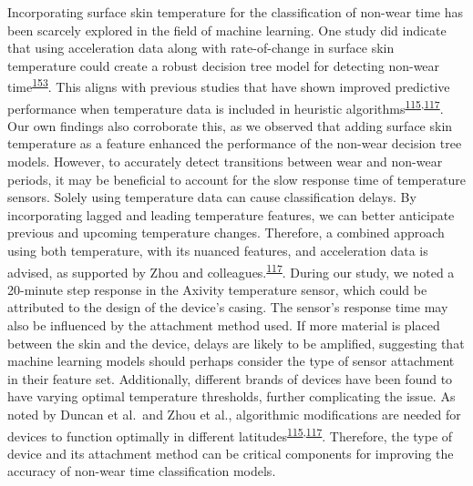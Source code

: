 \documentclass[
  10pt,
]{scrbook}
\begin{document}
Incorporating surface skin temperature for the classification of
non-wear time has been scarcely explored in the field of machine
learning. One study did indicate that using acceleration data along with
rate-of-change in surface skin temperature could create a robust
decision tree model for detecting non-wear
time\textsuperscript{\protect\hyperlink{ref-vert_detecting_2022}{153}}.
This aligns with previous studies that have shown improved predictive
performance when temperature data is included in heuristic
algorithms\textsuperscript{\protect\hyperlink{ref-duncan_wear-time_2018}{115},\protect\hyperlink{ref-zhou_classification_2015}{117}}.
Our own findings also corroborate this, as we observed that adding
surface skin temperature as a feature enhanced the performance of the
non-wear decision tree models. However, to accurately detect transitions
between wear and non-wear periods, it may be beneficial to account for
the slow response time of temperature sensors. Solely using temperature
data can cause classification delays. By incorporating lagged and
leading temperature features, we can better anticipate previous and
upcoming temperature changes. Therefore, a combined approach using both
temperature, with its nuanced features, and acceleration data is
advised, as supported by Zhou and
colleagues.\textsuperscript{\protect\hyperlink{ref-zhou_classification_2015}{117}}.
During our study, we noted a 20-minute step response in the Axivity
temperature sensor, which could be attributed to the design of the
device's casing. The sensor's response time may also be influenced by
the attachment method used. If more material is placed between the skin
and the device, delays are likely to be amplified, suggesting that
machine learning models should perhaps consider the type of sensor
attachment in their feature set. Additionally, different brands of
devices have been found to have varying optimal temperature thresholds,
further complicating the issue. As noted by Duncan et al.~and Zhou et
al., algorithmic modifications are needed for devices to function
optimally in different
latitudes\textsuperscript{\protect\hyperlink{ref-duncan_wear-time_2018}{115},\protect\hyperlink{ref-zhou_classification_2015}{117}}.
Therefore, the type of device and its attachment method can be critical
components for improving the accuracy of non-wear time classification
models.
\end{document}
